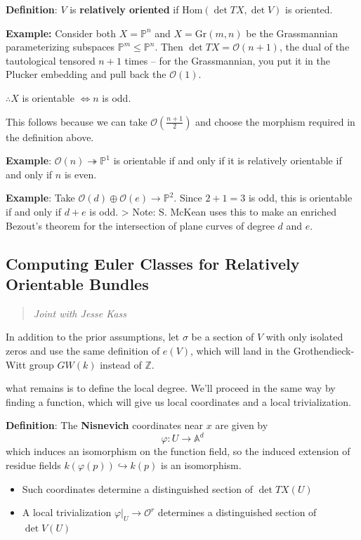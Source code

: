 \documentclass[11pt]{scrreprt}
\theoremstyle{definition}
\providecommand{\tightlist}{%
  \setlength{\itemsep}{0pt}\setlength{\parskip}{0pt}}
\newcommand{\ZZ}[0]{{\mathbb{Z}}}
\newcommand{\PP}[0]{{\mathbb{P}}}
\newcommand{\Af}[0]{{\mathbb{A}}}
\newcommand{\Gr}[0]{{\text{Gr}}}
\newcommand{\OO}[0]{{\mathcal{O}}}
\newcommand{\restrictionof}[2]{{\left.{#1}\right|_{#2}}}
\newcommand{\surjects}[0]{\twoheadrightarrow}
\newcommand{\injects}[0]{\hookrightarrow}
\renewcommand{\hom}[0]{\text{Hom}}
\begin{document}
\textbf{Definition}: \(V\) is \textbf{relatively oriented} if
\(\hom(\det TX, \det V)\) is oriented.

\textbf{Example:} Consider both \(X = \PP^n\) and \(X = \Gr(m,n)\) be
the Grassmannian parameterizing subspaces \(\PP^m \leq \PP^n\). Then
\(\det TX = \mathcal O(n+1)\), the dual of the tautological tensored
\(n+1\) times -- for the Grassmannian, you put it in the Plucker
embedding and pull back the \(\mathcal O(1)\).

\(\therefore X\) is orientable \(\iff n\) is odd.

This follows because we can take \(\mathcal O( \frac{n+1} {2})\) and
choose the morphism required in the definition above.

\textbf{Example}: \(\mathcal O(n) \surjects \PP^1\) is orientable if and
only if it is relatively orientable if and only if \(n\) is even.

\textbf{Example}: Take \(\OO(d)\oplus \OO(e) \to \PP^2\). Since
\(2+1=3\) is odd, this is orientable if and only if \(d+e\) is odd.
\textgreater{} Note: S. McKean uses this to make an enriched Bezout's
theorem for the intersection of plane curves of degree \(d\) and \(e\).

\hypertarget{computing-euler-classes-for-relatively-orientable-bundles}{%
\subsection{Computing Euler Classes for Relatively Orientable
Bundles}\label{computing-euler-classes-for-relatively-orientable-bundles}}

\begin{quote}\textit{
Joint with Jesse Kass
}\end{quote}

In addition to the prior assumptions, let \(\sigma\) be a section of
\(V\) with only isolated zeros and use the same definition of \(e(V)\),
which will land in the Grothendieck-Witt group \(GW(k)\) instead of
\(\ZZ\).

what remains is to define the local degree. We'll proceed in the same
way by finding a function, which will give us local coordinates and a
local trivialization.

\textbf{Definition}: The \textbf{Nisnevich} coordinates near \(x\) are
given by \[
\varphi: U \to \Af^d
\] which induces an isomorphism on the function field, so the induced
extension of residue fields \(k(\varphi(p)) \injects k(p)\) is an
isomorphism.

\begin{itemize}
\tightlist
\item
  Such coordinates determine a distinguished section of \(\det TX(U)\)
\item
  A local trivialization \(\restrictionof{\varphi}{U} \to \OO^r\)
  determines a distinguished section of \(\det V(U)\)
\end{itemize}
\end{document}
